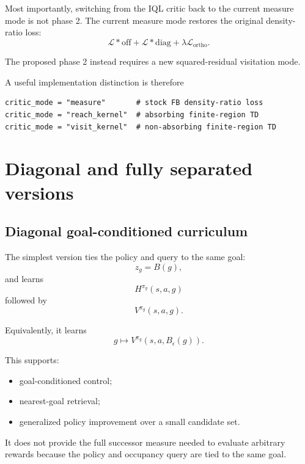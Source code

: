 \documentclass[10pt]{article}
\begin{document}
Most importantly, switching from the IQL critic back to the current measure mode is not
phase 2.
The current measure mode restores the original density-ratio loss:
\begin{equation}
\mathcal{L}*{\mathrm{off}}
+
\mathcal{L}*{\mathrm{diag}}
+
\lambda\mathcal{L}_{\mathrm{ortho}}.
\end{equation}

The proposed phase 2 instead requires a new squared-residual visitation mode.

A useful implementation distinction is therefore
\begin{verbatim}
critic_mode = "measure"       # stock FB density-ratio loss
critic_mode = "reach_kernel"  # absorbing finite-region TD
critic_mode = "visit_kernel"  # non-absorbing finite-region TD
\end{verbatim}

\section{Diagonal and fully separated versions}

\subsection{Diagonal goal-conditioned curriculum}

The simplest version ties the policy and query to the same goal:
\begin{equation}
z_g=B(g),
\end{equation}
and learns
\begin{equation}
H^{\pi_g}(s,a,g)
\end{equation}
followed by
\begin{equation}
V^{\pi_g}(s,a,g).
\end{equation}

Equivalently, it learns
\begin{equation}
g
\longmapsto
V^{\pi_g}
\left(
s,a,B_\epsilon(g)
\right).
\end{equation}

This supports:
\begin{itemize}
\item goal-conditioned control;
\item nearest-goal retrieval;
\item generalized policy improvement over a small candidate set.
\end{itemize}

It does not provide the full successor measure needed to evaluate arbitrary rewards
because the policy and occupancy query are tied to the same goal.
\end{document}
